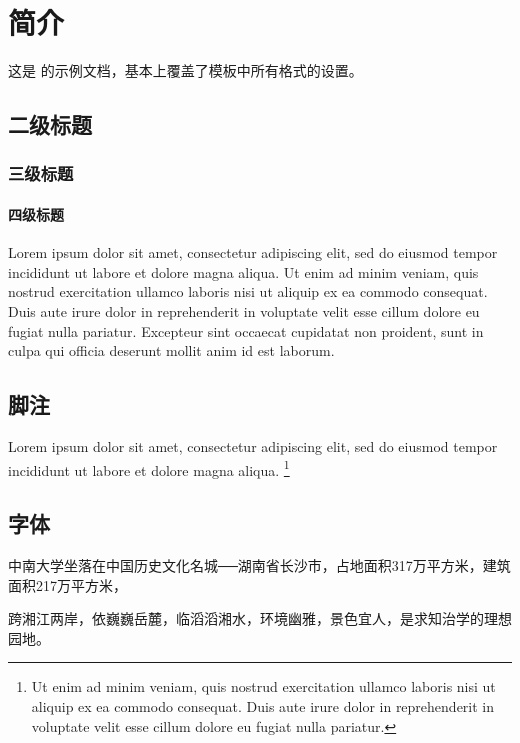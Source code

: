 
\chapter{简介}

这是 \csuthesis 的示例文档，基本上覆盖了模板中所有格式的设置。

\section{二级标题}

\subsection{三级标题}

\subsubsection{四级标题}

Lorem ipsum dolor sit amet, consectetur adipiscing elit, sed do eiusmod tempor
incididunt ut labore et dolore magna aliqua. Ut enim ad minim veniam, quis
nostrud exercitation ullamco laboris nisi ut aliquip ex ea commodo consequat.
Duis aute irure dolor in reprehenderit in voluptate velit esse cillum dolore eu
fugiat nulla pariatur. Excepteur sint occaecat cupidatat non proident, sunt in
culpa qui officia deserunt mollit anim id est laborum.

\section{脚注}

Lorem ipsum dolor sit amet, consectetur adipiscing elit, sed do eiusmod tempor
incididunt ut labore et dolore magna aliqua. \footnote{Ut enim ad minim veniam,
  quis nostrud exercitation ullamco laboris nisi ut aliquip ex ea commodo
  consequat. Duis aute irure dolor in reprehenderit in voluptate velit esse cillum
  dolore eu fugiat nulla pariatur.}

\section{字体}

中南大学坐落在中国历史文化名城──湖南省长沙市，占地面积317万平方米，建筑面积217万平方米，

{\songti 跨湘江两岸，依巍巍岳麓，临滔滔湘水，环境幽雅，景色宜人，是求知治学的理想园地。
}


